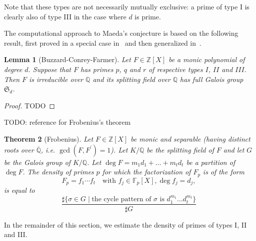 \documentclass[11pt]{article}
\theoremstyle{plain}
\newtheorem{theorem}{Theorem}[section]
\newtheorem{lemma}[theorem]{Lemma}
\theoremstyle{definition}
\theoremstyle{remark}
\numberwithin{equation}{section}
\numberwithin{table}{section}
\newcommand{\ZZ}{\mathbb{Z}}
\newcommand{\FF}{\mathbb{F}}
\newcommand{\QQ}{\mathbb{Q}}
\renewcommand{\SS}{\mathfrak{S}}
\begin{document}
Note that these types are not necessarily mutually exclusive: a prime of type I
is clearly also of type III in the case where $d$ is prime.

The computational approach to Maeda's conjecture is based on the following
result, first proved in a special case in~\cite{Buzzard} and then generalized
in~\cite{ConreyFarmer}.

\begin{lemma}[Buzzard-Conrey-Farmer]
  Let $F\in\ZZ[X]$ be a monic polynomial of degree $d$.  Suppose that $F$ has
  primes $p$, $q$ and $r$ of respective types $I$, $II$ and $III$.  Then $F$
  is irreducible over $\QQ$ and its splitting field over $\QQ$ has full Galois
  group $\SS_d$.
\end{lemma}
\begin{proof}
  TODO
\end{proof}

TODO: reference for Frobenius's theorem

\begin{theorem}[Frobenius]
  Let $F\in\ZZ[X]$ be monic and separable (having distinct roots over
  $\overline{\QQ}$, i.e. $\gcd(F, F^\prime)=1$).  Let $K/\QQ$ be the splitting
  field of $F$ and let $G$ be the Galois group of $K/\QQ$.  
  Let $\deg F=m_1d_1+\ldots+m_td_t$ be a partition of $\deg F$.  
  The density of primes $p$ for which the factorization of $F_p$ is of the
  form
  \begin{equation*}
    F_p=f_1\cdots f_t\quad\text{with }f_j\in\FF_p[X], \deg f_j=d_j,
  \end{equation*}
  is equal to
  \begin{equation*}
    \frac{\sharp\{\sigma\in G\mid\text{the cycle pattern of $\sigma$ is 
    $d_1^{m_1}\ldots d_t^{m_t}$}\}
    }{\sharp G}
  \end{equation*}
\end{theorem}

In the remainder of this section, we estimate the density of primes of types
I, II and III.
\end{document}
